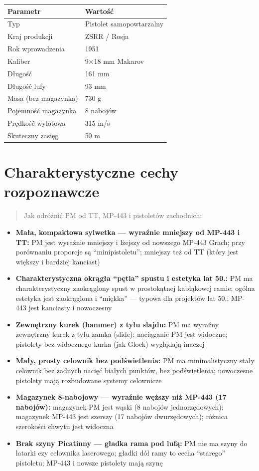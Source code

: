 \documentclass[12pt,openany,oneside]{book}
\providecommand{\tightlist}{%
  \setlength{\itemsep}{0pt}\setlength{\parskip}{0pt}}
\begin{document}
\begin{longtable}[]{@{}ll@{}}
\toprule\noalign{}
Parametr & Wartość \\
\midrule\noalign{}
\endhead
\bottomrule\noalign{}
\endlastfoot
Typ & Pistolet samopowtarzalny \\
Kraj produkcji & ZSRR / Rosja \\
Rok wprowadzenia & 1951 \\
Kaliber & 9×18 mm Makarov \\
Długość & 161 mm \\
Długość lufy & 93 mm \\
Masa (bez magazynka) & 730 g \\
Pojemność magazynka & 8 nabojów \\
Prędkość wylotowa & 315 m/s \\
Skuteczny zasięg & 50 m \\
\end{longtable}

\section{Charakterystyczne cechy
rozpoznawcze}\label{charakterystyczne-cechy-rozpoznawcze-86}

\begin{quote}
Jak odróżnić PM od TT, MP-443 i pistoletów zachodnich:
\end{quote}

\begin{itemize}
\tightlist
\item
  \textbf{Mała, kompaktowa sylwetka --- wyraźnie mniejszy od MP-443 i
  TT:} PM jest wyraźnie mniejszy i lżejszy od nowszego MP-443 Grach;
  przy porównaniu proporcje są ``minipistoletu''; mniejszy też od TT
  (który jest większy i bardziej kanciast)
\item
  \textbf{Charakterystyczna okrągła ``pętla'' spustu i estetyka lat
  50.:} PM ma charakterystyczny zaokrąglony spust w prostokątnej
  kabłąkowej ramie; ogólna estetyka jest zaokrąglona i ``miękka'' ---
  typowa dla projektów lat 50.; MP-443 jest kanciasty i nowoczesny
\item
  \textbf{Zewnętrzny kurek (hammer) z tyłu slajdu:} PM ma wyraźny
  zewnętrzny kurek z tyłu zamka (slide); naciąganie PM jest widoczne;
  pistolety bez widocznego kurka (jak Glock) wyglądają inaczej
\item
  \textbf{Mały, prosty celownik bez podświetlenia:} PM ma
  minimalistyczny stały celownik bez żadnych nacięć białych punktów, bez
  podświetlenia; nowoczesne pistolety mają rozbudowane systemy
  celownicze
\item
  \textbf{Magazynek 8-nabojowy --- wyraźnie węższy niż MP-443 (17
  nabojów):} magazynek PM jest wąski (8 nabojów jednorzędowych);
  magazynek MP-443 jest szerszy (17 nabojów dwurzędowych); różnica
  szerokości chwytu jest widoczna
\item
  \textbf{Brak szyny Picatinny --- gładka rama pod lufą:} PM nie ma
  szyny do latarki czy celownika laserowego; gładki dół ramy to cecha
  ``starego'' pistoletu; MP-443 i nowsze pistolety mają szynę
\end{itemize}
\end{document}
